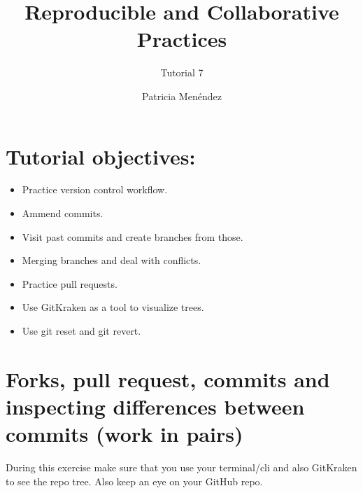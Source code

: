 \documentclass[
]{article}
\title{Reproducible and Collaborative Practices}
\subtitle{Tutorial 7}
\author{Patricia Menéndez}
\date{}
\begin{document}
\maketitle

{
\setcounter{tocdepth}{2}
\tableofcontents
}
\section*{Tutorial objectives:}
\begin{tcolorbox}
 \begin{itemize}
   \item Practice version control workflow.
   \item Ammend commits.
   \item Visit past commits and create branches from those.
   \item Merging branches and deal with conflicts.
   \item Practice pull requests.
   \item Use GitKraken as a tool to visualize trees.
   \item Use git reset and git revert.
 \end{itemize}
\end{tcolorbox}

\clearpage

\hypertarget{forks-pull-request-commits-and-inspecting-differences-between-commits-work-in-pairs}{%
\section{Forks, pull request, commits and inspecting differences between
commits (work in
pairs)}\label{forks-pull-request-commits-and-inspecting-differences-between-commits-work-in-pairs}}

During this exercise make sure that you use your terminal/cli and also
GitKraken to see the repo tree. Also keep an eye on your GitHub repo.
\end{document}
